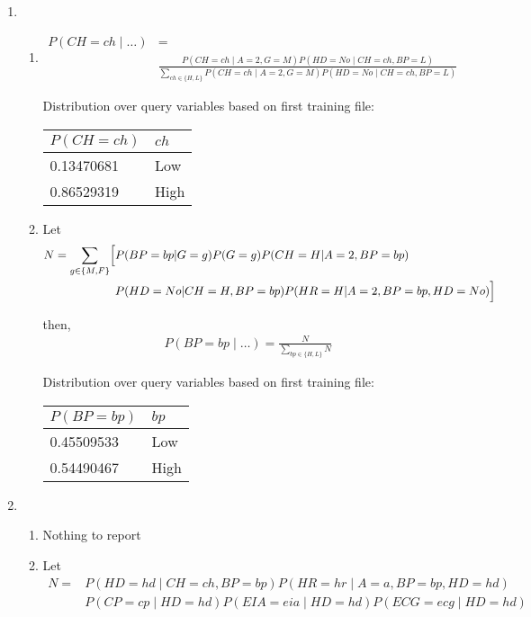 \documentclass[12pt]{article}
\begin{document}
\begin{enumerate}
\item %
\begin{enumerate}
\item

\begin{align*}
P(CH=ch\mid \ldots) &= \\
&\frac{P(CH=ch\mid A=2,G=M)P(HD=No\mid CH=ch,BP=L)}{\sum_{ch \in \{H,L\}}P(CH=ch\mid A=2,G=M)P(HD=No\mid CH=ch,BP=L)}
\end{align*}

Distribution over query variables based on first training file:

\begin{tabular}{ll}
$P(CH=ch)$ & $ch$ \\ \hline
0.13470681 & Low \\
0.86529319 & High
\end{tabular}

\item
Let
\begin{align*}
N = \sum_{g \in \{M,F\}}\Bigl[
&P(BP=bp|G=g)
P(G=g)
P(CH=H|A=2,BP=bp)\\
&P(HD=No|CH=H,BP=bp)
P(HR=H|A=2,BP=bp,HD=No)\Bigr]
\end{align*}

then,
\begin{align*}
P(BP=bp\mid \ldots) = \frac{N}{\sum_{bp\in\{H,L\}}N}
\end{align*}

Distribution over query variables based on first training file:

\begin{tabular}{ll}
$P(BP=bp)$ & $bp$ \\ \hline
0.45509533 & Low \\
0.54490467 & High
\end{tabular}

\end{enumerate}

\item %
\begin{enumerate}
\item Nothing to report

\item
Let
\begin{align*}
N = 
&P(HD=hd\mid CH=ch,BP=bp)
P(HR=hr\mid A=a,BP=bp,HD=hd)\\
&P(CP=cp\mid HD=hd)
P(EIA=eia\mid HD=hd)
P(ECG=ecg\mid HD=hd)
\end{align*}


\end{enumerate}
\end{enumerate}
\end{document}
